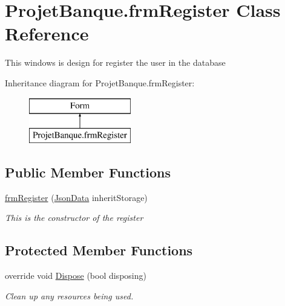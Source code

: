 \hypertarget{class_projet_banque_1_1frm_register}{}\section{Projet\+Banque.\+frm\+Register Class Reference}
\label{class_projet_banque_1_1frm_register}


This windows is design for register the user in the database  


Inheritance diagram for Projet\+Banque.\+frm\+Register\+:\begin{figure}[H]
\begin{center}
\leavevmode
\includegraphics[height=2.000000cm]{class_projet_banque_1_1frm_register}
\end{center}
\end{figure}
\subsection*{Public Member Functions}
\begin{DoxyCompactItemize}
\item 
\mbox{\hyperlink{class_projet_banque_1_1frm_register_ad442e56ec83d3aef24ae712135291931}{frm\+Register}} (\mbox{\hyperlink{class_projet_banque_1_1_json_data}{Json\+Data}} inherit\+Storage)
\begin{DoxyCompactList}\small\item\em This is the constructor of the register \end{DoxyCompactList}\end{DoxyCompactItemize}
\subsection*{Protected Member Functions}
\begin{DoxyCompactItemize}
\item 
override void \mbox{\hyperlink{class_projet_banque_1_1frm_register_a243860ddb36ba23a63c3e6ecedb33bc6}{Dispose}} (bool disposing)
\begin{DoxyCompactList}\small\item\em Clean up any resources being used. \end{DoxyCompactList}\end{DoxyCompactItemize}


